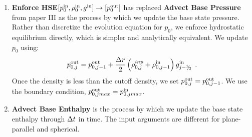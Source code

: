 \begin{enumerate}
\item {\bf Enforce HSE}$[p_0^{\mathrm{in}},\rho_0^{\mathrm{in}},g^{\mathrm{in}}] \rightarrow [p_0^{\mathrm{out}}]$
has replaced {\bf Advect Base Pressure} from paper III as the process by which we 
update the base state pressure.  Rather than discretize the evolution equation
for $p_0$, we enforce hydrostatic equilibrium directly, which is simpler and
analytically equivalent.  We update $p_0$ using:
\begin{equation}
p_{0,j}^{\outp} = p_{0,j-1}^{\outp} + 
\frac{\Delta r}{2}\left(\rho_{0,j}^{inp}+\rho_{0,j-1}^{\inp}\right)g_{j-\myhalf}^{\inp}\enskip .
\end{equation}
Once the density is less than the cutoff density, we set $p_{0,j}^{\mathrm{out}} = p_{0,j-1}^{\mathrm{out}}$.
We use the boundary condition, $p_{0,jmax}^{\mathrm{out}} = p_{0,jmax}^{\mathrm{in}}$.

\item {\bf Advect Base Enthalpy}
is the process by which we update the base state enthalpy through $\Delta t$ in time.
The input arguments are different for plane-parallel and spherical.
\end{enumerate}
